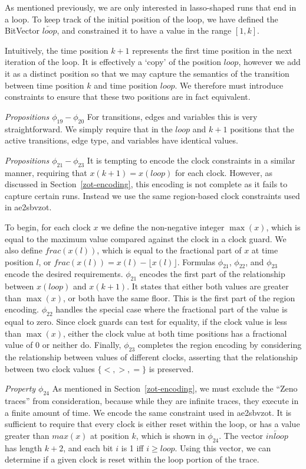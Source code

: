 \documentclass[a4paper,11pt]{report}
\theoremstyle{definition}
\newcommand{\aez}{ae2sbvzot}
\begin{document}
As mentioned previously, we are only interested in lasso-shaped runs that end in
a loop. To keep track of the initial position of the loop, we have defined the
BitVector \(\overleftarrow{loop}\), and constrained it to have a value in the
range \([1,k]\).

Intuitively, the time position \(k{+}1\) represents the first time position in the
next iteration of the loop. It is effectively a `copy' of the position
\(loop\), however we add it as a distinct position so that we may capture
the semantics of the transition between time position \(k\) and time position
\(loop\). We therefore must introduce constraints to ensure that these two
positions are in fact equivalent.

\emph{Propositions $\phi_{19}-\phi_{20}$} For transitions, edges and variables
this is very straightforward. We simply require that in the $loop$ and $k{+}1$
positions that the active transitions, edge type, and variables have identical
values.

\emph{Propositions $\phi_{21}-\phi_{23}$} It is tempting to encode the clock
constraints in a similar manner, requiring that \(x(k+1) = x(loop)\) for each
clock. However, as discussed in Section~\ref{zot-encoding}, this encoding is not
complete as it fails to capture certain runs. Instead we use the same
region-based clock constraints used in \aez.

To begin, for each clock
\(x\) we define the non-negative integer \(\max(x)\), which is equal to the
maximum value compared
against the clock in a clock guard. We also define \(frac(x(l))\), which is
equal to the fractional part of \(x\) at time position \(l\), or
\(frac(x(l)) = x(l) - \lfloor x(l) \rfloor\). Formulas \(\phi_{21}\),
\(\phi_{22}\), and \(\phi_{23}\) encode the desired requirements. \(\phi_{21}\)
encodes the first part of the relationship between \(x(loop)\) and \(x(k+1)\).
It states that either both values are greater than \(\max(x)\), or both have the
same floor. This is the first part of the region encoding. \(\phi_{22}\) handles
the special case where the fractional part of the value is equal to zero. Since
clock guards can test for equality, if the clock value is less than \(\max(x)\),
either the clock value at both time positions has a fractional value of 0 or
neither do. Finally, \(\phi_{23}\) completes the region encoding by considering
the relationship between values of different clocks, asserting that the
relationship between two clock values \(\{<,>,=\}\) is preserved.

\emph{Property $\phi_{24}$} As mentioned in Section~\ref{zot-encoding}, we must
exclude the ``Zeno traces'' from consideration, because while they are infinite
traces, they execute in a finite amount of time. We encode the same constraint
used in \aez. It is sufficient to require that every clock is either reset
within the loop, or has a value greater than \(max(x)\) at position \(k\), which
is shown in \(\phi_{24}\). The vector \(\overleftarrow{inloop}\) has length
\(k+2\), and each bit \(i\) is 1 iff \(i \geq loop\). Using this vector, we can
determine if a given clock is reset within the loop portion of the trace.
\end{document}
